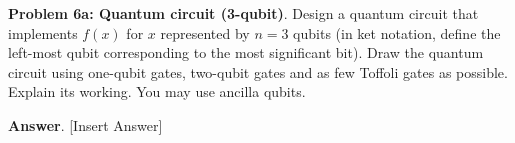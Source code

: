 \textbf{Problem 6a: Quantum circuit (3-qubit)}. Design a quantum circuit that implements $f(x)$ for $x$ represented by $n=3$ qubits (in ket notation, define the left-most qubit corresponding to the most significant bit). 
Draw the quantum circuit using one-qubit gates, two-qubit gates and as few Toffoli gates as possible. 
Explain its working. 
You may use ancilla qubits.


\textbf{Answer}. [Insert Answer]


